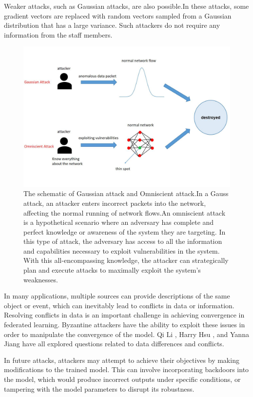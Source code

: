 \documentclass[conference]{IEEEtran}
\begin{document}
Weaker attacks, such as Gaussian attacks, are also possible.In these attacks, some gradient vectors are replaced with random vectors sampled from a Gaussian distribution that has a large variance.
Such attackers do not require any information from the staff members.

\begin{figure}[htbp]
    \centerline{\includegraphics[width=0.8\linewidth,height=0.6\linewidth]{picture/gause.jpg}}
    \caption{The schematic of Gaussian attack and Omniscient attack.In a Gauss attack, an attacker enters incorrect packets into the network, affecting the normal running of network flows.An omniscient attack is a hypothetical scenario where an adversary has complete and perfect knowledge or awareness of the system they are targeting. In this type of attack, the adversary has access to all the information and capabilities necessary to exploit vulnerabilities in the system. With this all-encompassing knowledge, the attacker can strategically plan and execute attacks to maximally exploit the system’s weaknesses.
    }
    \label{fig14}
\end{figure}

In many applications, multiple sources can provide descriptions of the same object or event, which 
can inevitably lead to conflicts in data or information. Resolving conflicts in data is an important
challenge in achieving convergence in federated learning. Byzantine attackers have the ability to 
exploit these issues in order to manipulate the convergence of the model. 
Qi Li \cite{b122}, Harry Hsu \cite{b123}, and Yanna Jiang \cite{b124} have all explored questions related to data differences and conflicts.
 
In future attacks, attackers may attempt to achieve their objectives by making modifications to the 
trained model. This can involve incorporating backdoors into the model, which would produce 
incorrect outputs under specific conditions, or tampering with the model parameters to disrupt its robustness. 
\end{document}
